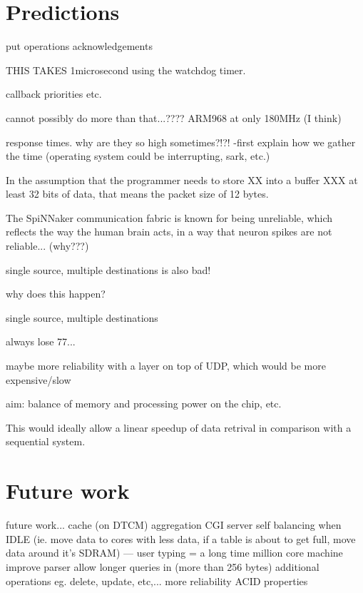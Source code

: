 \section{Predictions}




put operations
acknowledgements

THIS TAKES 1microsecond using the watchdog timer.

callback priorities etc.

cannot possibly do more than that...????
ARM968 at only 180MHz (I think)

response times. why are they so high sometimes?!?!
-first explain how we gather the time (operating system could be interrupting, sark, etc.)


In the assumption that the programmer needs to store XX into a buffer XXX
at least 32 bits of data, that means the packet size of 12 bytes.


The SpiNNaker communication fabric is known for being unreliable, which reflects the way the human brain acts, in a way that neuron spikes are not reliable... (why???)

single source, multiple destinations is also bad!

why does this happen?

single source, multiple destinations

always lose 77...

maybe more reliability with a layer on top of UDP, which would be more expensive/slow

aim: balance of memory and processing power on the chip, etc.

This would ideally allow a linear speedup of data retrival in comparison with a sequential system.


\section{Future work}
future work...
cache (on DTCM)
aggregation
CGI server
self balancing when IDLE (ie. move data to cores with less data, if a table is about to get full, move data around it's SDRAM) --- user typing = a long time
million core machine
improve parser
allow longer queries in (more than 256 bytes)
additional operations eg. delete, update, etc,...
more reliability
ACID properties